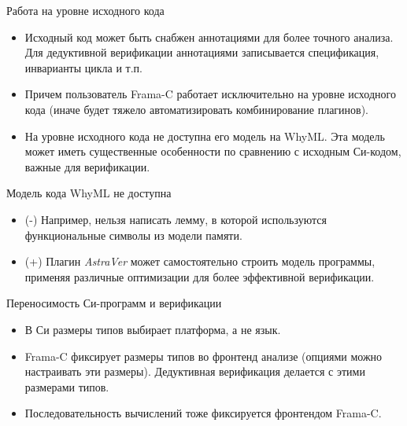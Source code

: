 \documentclass[hyperref={unicode=true}]{beamer}
\begin{document}
    \begin{frame}{Работа на уровне исходного кода}
    \begin{itemize}
    \item Исходный код может быть снабжен аннотациями
    для более точного анализа. Для дедуктивной верификации
    аннотациями записывается спецификация, инварианты цикла
    и т.п.
    \item Причем пользователь Frama-C работает
    исключительно на уровне исходного кода (иначе будет тяжело
    автоматизировать комбинирование плагинов).
    \item На уровне исходного кода не доступна его модель на WhyML.
    Эта модель может иметь существенные особенности по сравнению
    с исходным Си-кодом, важные для верификации.
    \end{itemize}
    \end{frame}

    \begin{frame}{Модель кода WhyML не доступна}
    \begin{itemize}
    \item (-) Например, нельзя написать лемму, в которой
    используются функциональные символы из модели памяти.
    \item (+) Плагин \textsl{AstraVer} может самостоятельно
    строить модель программы, применяя различные
    оптимизации для более эффективной верификации.
    \end{itemize}
    \end{frame}

    \begin{frame}{Переносимость Си-программ и верификации}
    \begin{itemize}
    \item
    В Си размеры типов выбирает платформа, а не язык.
    \item
    Frama-C фиксирует размеры типов во фронтенд анализе
    (опциями можно настраивать эти размеры). Дедуктивная
    верификация делается с этими размерами типов.
    \item
    Последовательность вычислений тоже фиксируется
    фронтендом Frama-C.
    \end{itemize}
    \end{frame}
\end{document}
